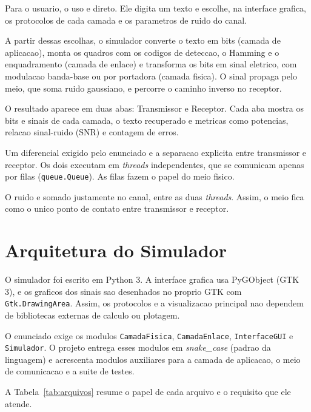 \documentclass[12pt,a4paper]{article}
\begin{document}
Para o usuario, o uso e direto. Ele digita um texto e escolhe, na interface grafica, os protocolos de cada camada e os parametros de ruido do canal.

A partir dessas escolhas, o simulador converte o texto em bits (camada de aplicacao), monta os quadros com os codigos de deteccao, o Hamming e o enquadramento (camada de enlace) e transforma os bits em sinal eletrico, com modulacao banda-base ou por portadora (camada fisica). O sinal propaga pelo meio, que soma ruido gaussiano, e percorre o caminho inverso no receptor.

O resultado aparece em duas abas: Transmissor e Receptor. Cada aba mostra os bits e sinais de cada camada, o texto recuperado e metricas como potencias, relacao sinal-ruido (SNR) e contagem de erros.

Um diferencial exigido pelo enunciado e a separacao explicita entre transmissor e receptor. Os dois executam em \textit{threads} independentes, que se comunicam apenas por filas (\texttt{queue.Queue}). As filas fazem o papel do meio fisico.

O ruido e somado justamente no canal, entre as duas \textit{threads}. Assim, o meio fica como o unico ponto de contato entre transmissor e receptor.

\section{Arquitetura do Simulador}

O simulador foi escrito em Python 3. A interface grafica usa PyGObject (GTK 3), e os graficos dos sinais sao desenhados no proprio GTK com \texttt{Gtk.DrawingArea}. Assim, os protocolos e a visualizacao principal nao dependem de bibliotecas externas de calculo ou plotagem.

O enunciado exige os modulos \texttt{CamadaFisica}, \texttt{CamadaEnlace}, \texttt{InterfaceGUI} e \texttt{Simulador}. O projeto entrega esses modulos em \textit{snake\_case} (padrao da linguagem) e acrescenta modulos auxiliares para a camada de aplicacao, o meio de comunicacao e a suite de testes.

A Tabela~\ref{tab:arquivos} resume o papel de cada arquivo e o requisito que ele atende.
\end{document}
